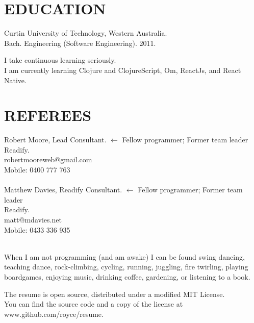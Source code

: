 \documentclass[margin]{res}
\begin{document}
\begin{resume}

  \section{EDUCATION}
  Curtin University of Technology, Western Australia. \\
  Bach. Engineering (Software Engineering). 2011.
  
  I take continuous learning seriously.\\I am currently learning Clojure and ClojureScript, Om, ReactJs, and React Native.

  \section{REFEREES}
  Robert Moore, Lead Consultant.
  \hfill $\longleftarrow$ Fellow programmer; Former team leader\\
  Readify. \\
  robertmooreweb@gmail.com \\
  Mobile: 0400 777 763 \\
  \\
  Matthew Davies, Readify Consultant.
  \hfill $\longleftarrow$ Fellow programmer; Former team leader\\
  Readify. \\
  matt@mdavies.net  \\
  Mobile: 0433 336 935 \\
  \\

\end{resume} 

\vfill
\centering

\hspace{-1.75in}  When I am not programming (and am awake) I can be found swing dancing, \\
\hspace{-1.75in}  teaching dance, rock-climbing, cycling, running, juggling, fire twirling, playing\\
\hspace{-1.75in}  boardgames, enjoying music, drinking coffee, gardening, or listening to a book.

\vfill
\hspace{-1.75in}  The resume is open source, distributed under a
                  modified MIT License. \\
\hspace{-1.75in}  You can find the source code and a copy of the license
                  at www.github.com/royce/resume.
\end{document}
